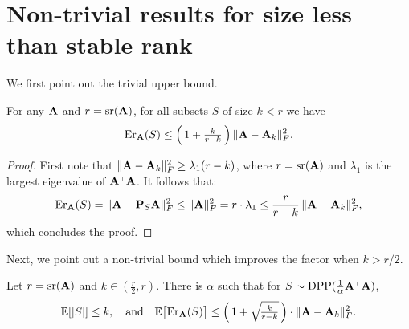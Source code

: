 \documentclass{article}
\begin{document}
  \section{Non-trivial results for size less than stable rank}
  We first point out the trivial upper bound.
  \begin{theorem}
    For any $\mathbf A$ and 
    $r={\mathrm{sr}}(\mathbf A)$, for all subsets $S$ of size $k<r$ we have
    \begin{align*}
      \mathrm{Er}_\mathbf A(S)\leq \Big(\,1+\tfrac{k}{r-k}\,\Big)\,\|\mathbf A-\mathbf A_k\|_F^2.
    \end{align*}
  \end{theorem}
  \begin{proof}
    First note that $\|\mathbf A-\mathbf A_k\|_F^2\geq \lambda_1(r-k)$, where
    $r={\mathrm{sr}}(\mathbf A)$ and $\lambda_1$ is the largest eigenvalue of
    $\A^\top\A$. It follows that:
    \begin{align*}
      \mathrm{Er}_\mathbf A(S) = \|\mathbf A-\mathbf P_S\mathbf A\|_F^2 \leq \|\mathbf A\|_F^2= r\cdot \lambda_1
      \leq \frac{r}{r-k}\,\|\mathbf A-\mathbf A_k\|_F^2,
    \end{align*}
    which concludes the proof.
  \end{proof}

  Next, we point out a non-trivial bound which improves the factor
  when $k>r/2$.
  \begin{theorem}
Let $r={\mathrm{sr}}(\mathbf A)$ and $k\in (\frac r2, r)$. There is $\alpha$ such that for
    $S\sim\DPP(\frac1\alpha\A^\top\A)$,
    \begin{align*}
      \mathbb E[|S|]\leq k,\quad\text{and}\quad\mathbb E\big[\mathrm{Er}_\mathbf A(S)\big] \leq
     \Big(\,1 +  \sqrt{\!\tfrac {k}{r-k}}\,\Big)\cdot\|\mathbf A-\mathbf A_k\|_F^2.
    \end{align*}
  \end{theorem}
\end{document}
